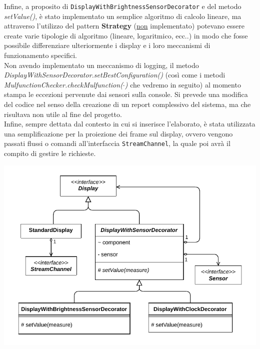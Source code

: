 \documentclass[a4paper,11pt]{article}
\begin{document}
	Infine, a proposito di \texttt{DisplayWithBrightnessSensorDecorator} e del metodo \textit{setValue()}, è stato implementato un semplice algoritmo di calcolo lineare, ma attraverso l'utilizzo del pattern \textbf{Strategy} (\underline{non} implementato) potevano essere create varie tipologie di algoritmo (lineare, logaritmico, ecc..) in modo che fosse possibile differenziare ulteriormente i display e i loro meccanismi di funzionamento specifici.\\
	Non avendo implementato un meccanismo di logging, il metodo \textit{DisplayWithSensorDecorator.setBestConfiguration()} (così come i metodi \textit{MulfunctionChecker.checkMulfunction($\cdot$)} che vedremo in seguito) al momento stampa le eccezioni pervenute dai sensori sulla console. Si prevede una modifica del codice nel senso della creazione di un report complessivo del sistema, ma che risultava non utile al fine del progetto.\\
	Infine, sempre dettata dal contesto in cui si inserisce l'elaborato, è stata utilizzata una semplificazione per la proiezione dei frame sul display, ovvero vengono passati flussi o comandi all'interfaccia \texttt{StreamChannel}, la quale poi avrà il compito di gestire le richieste.\\
	\begin{minipage}[c]{.5\textwidth}
		\centering
		\includegraphics[width=\textwidth]{diagramma/ClassDiagramm-DisplayHierarchy.pdf}
		\label{fig:display}
	\end{minipage}
%		
\end{document}
